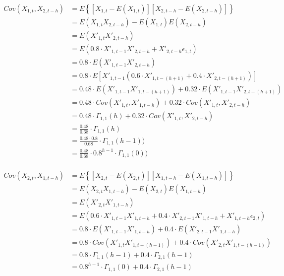 \begin{solution}
\begin{equation}
\begin{aligned}
Cov(X_{1,t},X_{2,t-h}) 	& = E\left\{[X_{1,t} - E(X_{1,t})][X_{2,t-h} - E(X_{2,t-h})]\right\} \\
												& = E(X_{1,t}X_{2,t-h}) - E(X_{1,t})E(X_{2,t-h}) \\
												& = E(X'_{1,t}X'_{2,t-h})\\
												& = E\left(0.8 \cdot X'_{1,t-1}X'_{2,t-h} +  X'_{2,t-h}\epsilon_{1,t} \right)\\
												& = 0.8 \cdot E(X'_{1,t-1}X'_{2,t-h}) \\
												& = 0.8 \cdot E[X'_{1,t-1}(0.6 \cdot X'_{1,t-(h+1)} + 0.4 \cdot X'_{2,t-(h+1)})] \\
												& = 0.48 \cdot E(X'_{1,t-1}X'_{1,t-(h+1)}) + 0.32 \cdot E(X'_{1,t-1}X'_{2,t-(h+1)}) \\
												& = 0.48 \cdot Cov(X'_{1,t},X'_{1,t-h}) + 0.32 \cdot Cov(X'_{1,t},X'_{2,t-h}) \\
												& = 0.48 \cdot \Gamma_{1,1}(h) + 0.32 \cdot Cov(X'_{1,t},X'_{2,t-h}) \\
												& = \frac{0.48}{0.68} \cdot \Gamma_{1,1}(h) \\
												& = \frac{0.48 \cdot 0.8}{0.68} \cdot \Gamma_{1,1}(h-1)) \\
												& = \frac{0.48 }{0.68}\cdot 0.8^{h-1} \cdot \Gamma_{1,1}(0)) \\
\end{aligned}
\end{equation}

\begin{equation}
\begin{aligned}
Cov(X_{2,t},X_{1,t-h}) 	& = E\left\{[X_{2,t} - E(X_{2,t})][X_{1,t-h} - E(X_{1,t-h})]\right\} \\
												& = E(X_{2,t}X_{1,t-h}) - E(X_{2,t})E(X_{1,t-h}) \\
												& = E(X'_{2,t}X'_{1,t-h})\\
												& = E\left(0.6 \cdot X'_{1,t-1}X'_{1,t-h} + 0.4 \cdot X'_{2,t-1}X'_{1,t-h} + X'_{1,t-h}\epsilon_{2,t} \right)\\
												& = 0.8 \cdot E(X'_{1,t-1}X'_{1,t-h}) + 0.4 \cdot E(X'_{2,t-1}X'_{1,t-h}) \\
												& = 0.8 \cdot Cov(X'_{1,t}X'_{1,t-(h-1)}) + 0.4 \cdot Cov(X'_{2,t}X'_{1,t-(h-1)}) \\
												& = 0.8 \cdot \Gamma_{1,1}(h-1) + 0.4 \cdot \Gamma_{2,1}(h-1) \\
												& = 0.8^{h-1} \cdot \Gamma_{1,1}(0) + 0.4 \cdot \Gamma_{2,1}(h-1) \\
\end{aligned}
\end{equation}


\end{solution}
